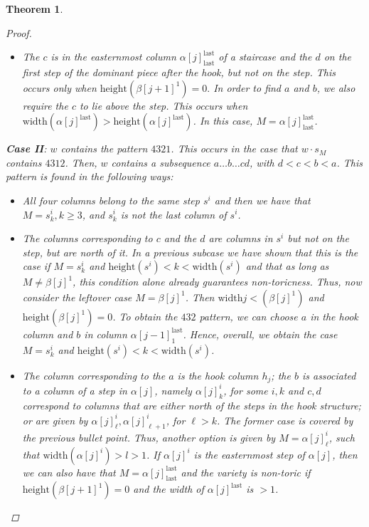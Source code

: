 \documentclass[11pt]{amsart}
\newtheorem{theorem}{Theorem}[section]
\theoremstyle{definition}
\theoremstyle{definition}
\theoremstyle{definition}
\theoremstyle{definition}
\begin{document}
\begin{theorem}
\begin{proof}
\begin{itemize}
    \item
    The $c$ is in the easternmost column $\alpha[j]^{\text{last}}_{\text{last}}$ of a staircase and the $d$ on the first step of the dominant piece after the hook, but not on the step. This occurs only when $\mathrm{height}(\beta[j+1]^1)=0.$
    In order to find $a$ and $b$, we also require the $c$ to lie above the step. This occurs when $\mathrm{width}(\alpha[j]^{\text{last}}) > \mathrm{height}(\alpha[j]^{\text{last}})$. In this case, $M = \alpha[j]^{\text{last}}_{\text{last}}$.

    \end{itemize} 

    \noindent \textbf{Case II}: $w$ contains the pattern $4321$. This occurs in the case that $w\cdot s_M$ contains $4312$. Then, $w$ contains a subsequence $a\ldots b\ldots cd$, with $d<c<b<a$. This pattern is found in the following ways:
    \begin{itemize}
        \item All four columns belong to the same step $s^i$ and then we have that $M=s^i_k, k\geq 3$, and $s^i_k$ is not the last column of $s^i$. 
        \item The columns corresponding to $c$ and the $d$ are columns in $s^i$ but not on the step, but are north of it. In a previous subcase we have shown that this is the case if $M= s^i_k$ and $\mathrm{height}(s^i) < k < \mathrm{width}(s^i)$ and that as long as $M \neq \beta[j]^1$, this condition alone already guarantees non-toricness. Thus, now consider the leftover case $M = \beta[j]^1$. Then $\mathrm{width}j<(\beta[j]^1)$ and $\mathrm{height}(\beta[j]^1)=0$. To obtain the $432$ pattern, we can choose $a$ in the hook column and $b$ in column $\alpha[j-1]^\mathrm{last}_1$. Hence, overall, we obtain the case $M= s^i_k$ and $\mathrm{height}(s^i) < k < \mathrm{width}(s^i)$.
        \item The column corresponding to the $a$ is the hook column $h_j$; the $b$ is associated to a column of a step in $\alpha[j]$, namely $\alpha[j]^i_k$, for some $i,k$ and $c,d$ correspond to columns that are either north of the steps in the hook structure; or are given by $\alpha[j]^i_\ell, \alpha[j]^i_{\ell+1}$, for $\ell>k$. The former case is covered by the previous bullet point. Thus, another option is given by $M=\alpha[j]^i_\ell$, such that $\text{width}(\alpha[j]^i) > l >1$. If $\alpha[j]^i$ is the easternmost step of $\alpha[j]$, then we can also have that $M=\alpha[j]^{\text{last}}_{\text{last}}$ and the variety is non-toric if $\mathrm{height}(\beta[j+1]^1)=0$ and the width of $\alpha[j]^\text{last}$ is $>1$. \qedhere
    \end{itemize}
\end{proof}
\end{theorem}
\end{document}
